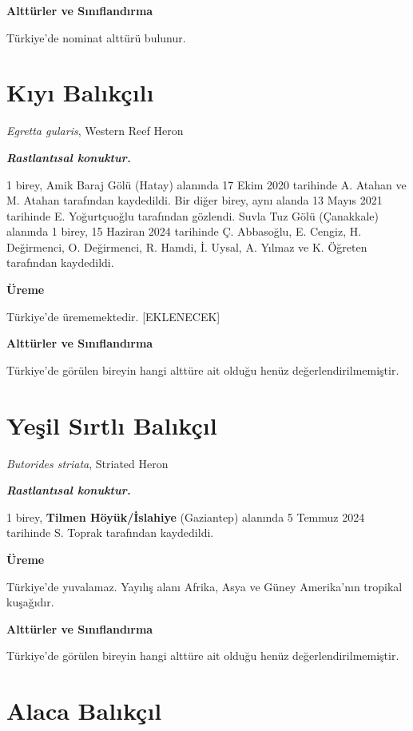 \documentclass[
  letterpaper,
  DIV=11,
  numbers=noendperiod]{scrreprt}
\begin{document}
\textbf{Alttürler ve Sınıflandırma}

Türkiye'de nominat alttürü bulunur.

\section{Kıyı Balıkçılı}\label{kux131yux131-balux131kuxe7ux131lux131}

\emph{Egretta gularis}, Western Reef Heron

\textbf{\emph{Rastlantısal konuktur.}}

1 birey, Amik Baraj Gölü (Hatay) alanında 17 Ekim 2020 tarihinde A.
Atahan ve M. Atahan tarafından kaydedildi. Bir diğer birey, aynı alanda
13 Mayıs 2021 tarihinde E. Yoğurtçuoğlu tarafından gözlendi. Suvla Tuz
Gölü (Çanakkale) alanında 1 birey, 15 Haziran 2024 tarihinde Ç.
Abbasoğlu, E. Cengiz, H. Değirmenci, O. Değirmenci, R. Hamdi, İ. Uysal,
A. Yılmaz ve K. Öğreten tarafından kaydedildi.

\textbf{Üreme}

Türkiye'de ürememektedir. {[}EKLENECEK{]}

\textbf{Alttürler ve Sınıflandırma}

Türkiye'de görülen bireyin hangi alttüre ait olduğu henüz
değerlendirilmemiştir.

\section{Yeşil Sırtlı
Balıkçıl}\label{yeux15fil-sux131rtlux131-balux131kuxe7ux131l}

\emph{Butorides striata}, Striated Heron

\textbf{\emph{Rastlantısal konuktur.}}

1 birey, \textbf{Tilmen Höyük/İslahiye} (Gaziantep) alanında 5 Temmuz
2024 tarihinde S. Toprak tarafından kaydedildi.

\textbf{Üreme}

Türkiye'de yuvalamaz. Yayılış alanı Afrika, Asya ve Güney Amerika'nın
tropikal kuşağıdır.

\textbf{Alttürler ve Sınıflandırma}

Türkiye'de görülen bireyin hangi alttüre ait olduğu henüz
değerlendirilmemiştir.

\section{Alaca Balıkçıl}\label{alaca-balux131kuxe7ux131l}
\end{document}

